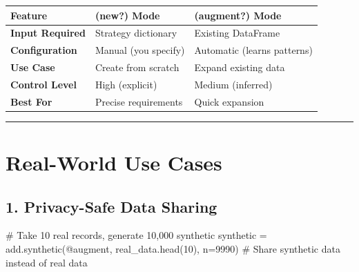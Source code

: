 \documentclass[
  letterpaper,
]{scrbook}
\newenvironment{Shaded}{\begin{snugshade}}{\end{snugshade}}
\newcommand{\CommentTok}[1]{\textcolor[rgb]{0.37,0.37,0.37}{#1}}
\newcommand{\DecValTok}[1]{\textcolor[rgb]{0.68,0.00,0.00}{#1}}
\newcommand{\NormalTok}[1]{\textcolor[rgb]{0.00,0.23,0.31}{#1}}
\newcommand{\OperatorTok}[1]{\textcolor[rgb]{0.37,0.37,0.37}{#1}}
\newcommand{\StringTok}[1]{\textcolor[rgb]{0.13,0.47,0.30}{#1}}
\begin{document}
\begin{longtable}[]{@{}
  >{\raggedright\arraybackslash}p{}
  >{\raggedright\arraybackslash}p{}
  >{\raggedright\arraybackslash}p{}@{}}
\toprule\noalign{}
\begin{minipage}[b]{\linewidth}\raggedright
Feature
\end{minipage} & \begin{minipage}[b]{\linewidth}\raggedright
(\textbf{new?}) Mode
\end{minipage} & \begin{minipage}[b]{\linewidth}\raggedright
(\textbf{augment?}) Mode
\end{minipage} \\
\midrule\noalign{}
\endhead
\bottomrule\noalign{}
\endlastfoot
\textbf{Input Required} & Strategy dictionary & Existing DataFrame \\
\textbf{Configuration} & Manual (you specify) & Automatic (learns
patterns) \\
\textbf{Use Case} & Create from scratch & Expand existing data \\
\textbf{Control Level} & High (explicit) & Medium (inferred) \\
\textbf{Best For} & Precise requirements & Quick expansion \\
\end{longtable}

\begin{center}\rule{0.5\linewidth}{0.5pt}\end{center}

\section{Real-World Use Cases}\label{real-world-use-cases}

\subsection{1. Privacy-Safe Data
Sharing}\label{privacy-safe-data-sharing}

\begin{Shaded}
\begin{Highlighting}[]
\CommentTok{\# Take 10 real records, generate 10,000 synthetic}
\NormalTok{synthetic }\OperatorTok{=}\NormalTok{ add.synthetic(}\StringTok{\textquotesingle{}@augment\textquotesingle{}}\NormalTok{, real\_data.head(}\DecValTok{10}\NormalTok{), n}\OperatorTok{=}\DecValTok{9990}\NormalTok{)}
\CommentTok{\# Share synthetic data instead of real data}
\end{Highlighting}
\end{Shaded}
\end{document}
